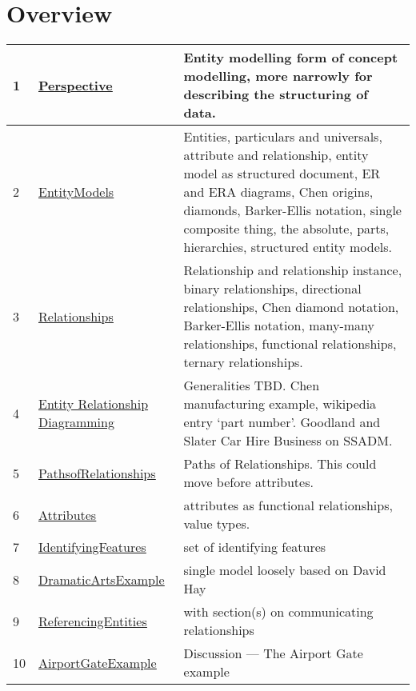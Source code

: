 
\newcommand{\mysection}[1]{\underline{\hyperref[#1]{#1}}}
\section*{Overview}
\label{Overview}
\begin{tabular}{l l p{7cm}}
1 & \mysection{Perspective} & Entity modelling form of concept modelling, more narrowly for describing the structuring of data.\\
\hline
2 & \mysection{EntityModels} & Entities, particulars and universals, attribute and relationship, entity model as structured document, ER and ERA diagrams, Chen origins, diamonds, Barker-Ellis notation, single composite thing, the absolute, parts, hierarchies, structured entity models.\\
\hline
3 & \mysection{Relationships} & Relationship and relationship instance, binary relationships, directional relationships, Chen diamond notation, Barker-Ellis notation, many-many relationships, functional relationships, ternary relationships. \\
\hline
4 & \mysection{Entity Relationship Diagramming} & Generalities TBD. Chen manufacturing example, wikipedia entry `part number'.
                                     Goodland and Slater Car Hire Business on SSADM.\\
\hline
5 & \mysection{PathsofRelationships} & Paths of Relationships. This could move before attributes.\\
\hline
6 & \mysection{Attributes} & attributes as functional relationships, value types.
\\
\hline
7 & \mysection{IdentifyingFeatures} &  set of identifying features\\
\hline
8 & \mysection{DramaticArtsExample} &  single model loosely based on David Hay\\
\hline
9 & \mysection{ReferencingEntities} &  with section(s) on communicating relationships\\
\hline
10 & \mysection{AirportGateExample} &  Discussion --- The Airport Gate example\\


\end{tabular}
